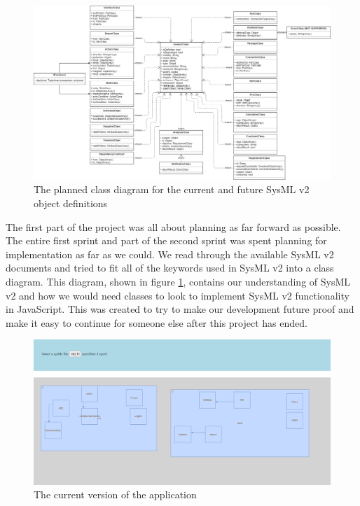 \documentclass{article}
\begin{document}
\begin{figure}[H]
    \centering
    \includegraphics[width=\textwidth]{Class_diagram-SysMLv2.png}
    \caption{The planned class diagram for the current and future SysML v2 object definitions}
    \label{fig:class_diagram}
\end{figure}
The first part of the project was all about planning as far forward as possible. The entire first sprint and part of the second sprint was spent planning for implementation as far as we could. We read through the available SysML v2 documents and tried to fit all of the keywords used in SysML v2 into a class diagram. This diagram, shown in figure \ref{fig:class_diagram}, contains our understanding of SysML v2 and how we would need classes to look to implement SysML v2 functionality in JavaScript. This was created to try to make our development future proof and make it easy to continue for someone else after this project has ended.


\begin{figure}[H]
    \centering
    \includegraphics[width=\textwidth]{unknown.png}
    \caption{The current version of the application}
    \label{fig:my_label}
\end{figure}
\end{document}

